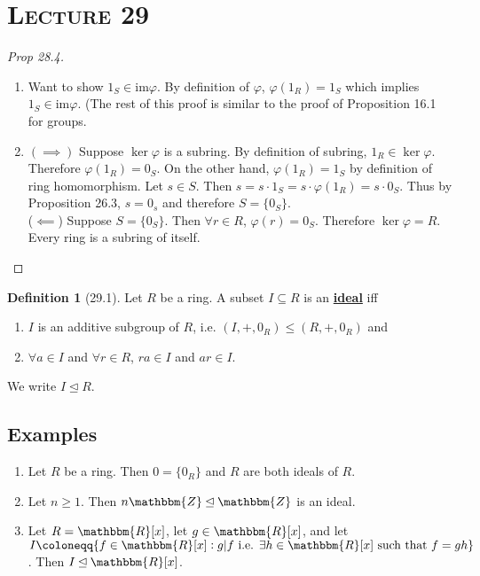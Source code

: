 \documentclass{article}
\newcommand{\Z}{\mathbbm{Z}}
\newcommand{\R}{\mathbbm{R}}
\newcommand{\coleq}{\coloneqq}
\newcommand{\define}[1]{\textbf{\underline{#1}}}
\renewcommand{\Subset}{\subseteq}
\theoremstyle{definition}
\newtheorem*{defn}{Definition}
\theoremstyle{remark}
\newcommand{\im}{\mathrm{im}}
\newcommand{\ideal}{\unlhd}
\begin{document}
    \section*{\textbf{\textsc{Lecture 29}}}{
        \begin{proof}[Prop 28.4]
            \begin{enumerate}
                \item Want to show $1_S \in \im\varphi$. By definition of $\varphi$, $\varphi(1_R)=1_S$ which implies $1_S \in \im\varphi$. (The rest of this proof is similar to the proof of Proposition 16.1 for groups.
                \item $(\implies)$ Suppose $\ker\varphi$ is a subring. By definition of subring, $1_R \in \ker \varphi$. Therefore $\varphi(1_R)=0_S$. On the other hand, $\varphi(1_R)=1_S$ by definition of ring homomorphism. Let $s \in S$. Then $s=s\cdot1_S=s\cdot\varphi(1_R)=s\cdot0_S$. Thus by Proposition 26.3, $s=0_s$ and therefore $S=\{0_S\}$.\\
                ($\impliedby$) Suppose $S=\{0_S\}$. Then $\forall r \in R$, $\varphi(r)=0_S$. Therefore $\ker\varphi=R$. Every ring is a subring of itself.
            \end{enumerate}
        \end{proof}
        
        \begin{defn}[29.1]
            Let $R$ be a ring. A subset $I \Subset R$ is an \define{ideal} iff
            \begin{enumerate}
                \item $I$ is an additive subgroup of $R$, i.e. $(I,+,0_R)\leq (R,+,0_R)$ and
                \item $\forall a \in I$ and $\forall r \in R$, $ra\in I$ and $ar \in I$.
            \end{enumerate}
            We write $I \ideal R$.
        \end{defn}
        
        \subsection*{Examples}{
            \begin{enumerate}
                \item Let $R$ be a ring. Then $0=\{0_R\}$ and $R$ are both ideals of $R$.
                \item Let $n\geq 1$. Then $n\Z \ideal \Z$ is an ideal.
                \item Let $R=\R[x]$, let $g \in \R[x]$, and let $I \coleq \{f\in \R[x]:g|f\text{ i.e. }\exists h \in \R[x]\text{ such that }f=gh\}$. Then $I \ideal \R[x]$.
            \end{enumerate}
        }
    }
    
\end{document}

